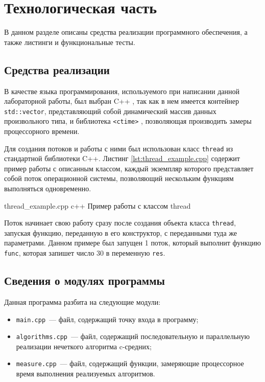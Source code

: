 \chapter{Технологическая часть}

В данном разделе описаны средства реализации программного обеспечения, а также листинги и функциональные тесты.

\section{Средства реализации}

В качестве языка программирования, используемого при написании данной лабораторной работы, был выбран C++ \cite{cpp-lang}, так как в нем имеется контейнер \texttt{std::vector}, представляющий собой динамический массив данных произвольного типа, и библиотека \texttt{<ctime>} \cite{ctime}, позволяющая производить замеры процессорного времени.

Для создания потоков и работы с ними был использован класс \texttt{thread} из стандартной библиотеки C++.
Листинг \ref{lst:thread_example.cpp} содержит пример работы с описанным классом, каждый экземпляр которого представляет собой поток операционной системы, позволяющий нескольким функциям выполняться одновременно.

	{thread_example.cpp}
	{c++}
	{Пример работы с классом thread}

Поток начинает свою работу сразу после создания объекта класса \texttt{thread}, запуская функцию, переданную в его конструктор, с переданными туда же параметрами.
Данном примере был запущен 1 поток, который выполнит функцию \texttt{func}, которая запишет число 30 в переменную \texttt{res}. 

\section{Сведения о модулях программы}

Данная программа разбита на следующие модули:

\begin{itemize}
	\item \texttt{main.cpp}~--- файл, содержащий точку входа в программу;
	\item \texttt{algorithms.cpp}~--- файл, содержащий последовательную и параллельную реализации нечеткого алгоритма c-средних;
	\item \texttt{measure.cpp}~--- файл, содержащий функции, замеряющие процессорное время выполнения реализуемых алгоритмов.
\end{itemize}

